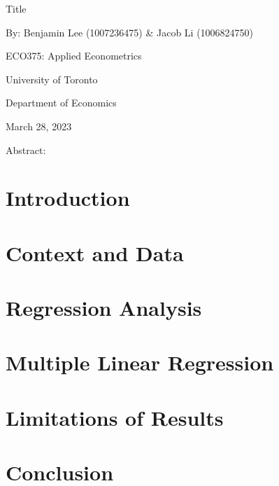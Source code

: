 \documentclass{eco_375_paper}
\begin{document}
\vspace*{\fill}
\begin{center}
	Title 
	
	By: Benjamin Lee (1007236475) \& Jacob Li (1006824750)
	\bigskip
	
	ECO375: Applied Econometrics 
	
	University of Toronto
	
	Department of Economics
	
	March 28, 2023
	
	\bigskip
	Abstract:
\end{center}
\vspace*{\fill}
\pagebreak

\section{Introduction}
\section{Context and Data}
\section{Regression Analysis}
\section{Multiple Linear Regression}
\section{Limitations of Results}
\section{Conclusion}
\end{document}
